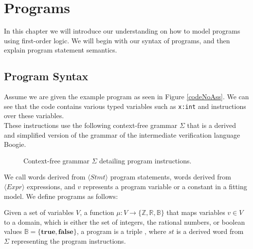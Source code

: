 \section{Programs}
In this chapter we will introduce our understanding on how to model programs using first-order logic. We will begin with our syntax of programs, and then explain program statement semantics.

\subsection{Program Syntax}
Assume we are given the example program as seen in Figure \ref{codeNoAss}. We can see that the code contains various typed variables such as \texttt{x:int} and instructions over these variables. \\ These instructions use the following context-free grammar $\Sigma$ that is a derived and simplified version of the grammar of the intermediate verification language Boogie\cite{Boogie}.
\setlength{\grammarparsep}{20pt plus 1pt minus 1pt} %
\setlength{\grammarindent}{12em} %
\begin{figure}[H]
	
	\caption{Context-free grammar $\Sigma$ detailing program instructions.}
	\label{grmr}
\end{figure}
We call words derived from $\langle Stmt \rangle$ program statements, words derived from $\langle Expr \rangle$ expressions, and $v$ represents a program variable or a constant in a fitting model.
We define programs as follows:

\begin{mydef}[Programs]
	Given a set of variables $V$, a function $\mu: V \rightarrow \{ \mathbb{Z}, \mathbb{R}, \mathbb{B} \}$ that maps variables $v \in V$ to a domain, which is either the set of integers, the rational numbers, or boolean values $\mathbb{B} = \{\textbf{true}, \textbf{false}\}$, a program is a triple \prg, where $st$ is a derived word from $\Sigma$ representing the program instructions.
\end{mydef}
